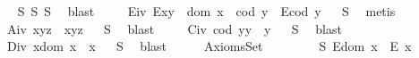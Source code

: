 \begin{isabellebody}
\isadelimproof
\ %
\endisadelimproof
%
\isatagproof
{}\isamarkupfalse%
\ S{}\ S{}\ S{}\ \isamarkupfalse%
\ blast%
\endisatagproof
{\isafoldproof}%
%
\isadelimproof
%
\endisadelimproof
\isanewline
\ \ \ \isamarkupfalse%
\ E\isactrlsub i\isactrlsub v{\isacharcolon}\ {\isachardoublequoteopen}E{\isacharparenleft}x{\isasymcdot}y{\isacharparenright}\ \isactrlbold {\isasymleftrightarrow}\ {\isacharparenleft}dom\ x\ {\isasymcong}\ cod\ y\ \isactrlbold {\isasymand}\ E{\isacharparenleft}cod\ y{\isacharparenright}{\isacharparenright}{\isachardoublequoteclose}%
\isadelimproof
\ %
\endisadelimproof
%
\isatagproof
{}\isamarkupfalse%
\ S{}\ \isamarkupfalse%
\ metis%
\endisatagproof
{\isafoldproof}%
%
\isadelimproof
%
\endisadelimproof
\isanewline
\ \ \ \isamarkupfalse%
\ A\isactrlsub i\isactrlsub v{\isacharcolon}\ {\isachardoublequoteopen}x{\isasymcdot}{\isacharparenleft}y{\isasymcdot}z{\isacharparenright}\ {\isasymcong}\ {\isacharparenleft}x{\isasymcdot}y{\isacharparenright}{\isasymcdot}z{\isachardoublequoteclose}%
\isadelimproof
\ %
\endisadelimproof
%
\isatagproof
{}\isamarkupfalse%
\ S{}\ \isamarkupfalse%
\ blast%
\endisatagproof
{\isafoldproof}%
%
\isadelimproof
%
\endisadelimproof
\isanewline
\ \ \ \isamarkupfalse%
\ C\isactrlsub i\isactrlsub v{\isacharcolon}\ {\isachardoublequoteopen}{\isacharparenleft}cod\ y{\isacharparenright}{\isasymcdot}y\ {\isasymcong}\ y{\isachardoublequoteclose}%
\isadelimproof
\ %
\endisadelimproof
%
\isatagproof
{}\isamarkupfalse%
\ S{}\ \isamarkupfalse%
\ blast%
\endisatagproof
{\isafoldproof}%
%
\isadelimproof
%
\endisadelimproof
\isanewline
\ \ \ \isamarkupfalse%
\ D\isactrlsub i\isactrlsub v{\isacharcolon}\ {\isachardoublequoteopen}x{\isasymcdot}{\isacharparenleft}dom\ x{\isacharparenright}\ {\isasymcong}\ x{\isachardoublequoteclose}%
\isadelimproof
\ %
\endisadelimproof
%
\isatagproof
{}\isamarkupfalse%
\ S{}\ \isamarkupfalse%
\ blast%
\endisatagproof
{\isafoldproof}%
%
\isadelimproof
%
\endisadelimproof
\isanewline
\ \ \isamarkupfalse%
%
\isamarkuptrue%
\ \isamarkupfalse%
\ AxiomsSet{}\isanewline
\ \ \ \isanewline
\ \ \ \isamarkupfalse%
\ S{}{\isacharcolon}\ {\isachardoublequoteopen}E{\isacharparenleft}dom\ x{\isacharparenright}\ \isactrlbold {\isasymrightarrow}\ E\ x{\isachardoublequoteclose}%

\end{isabellebody}
